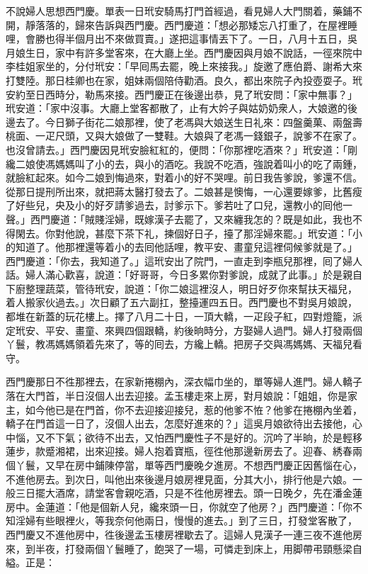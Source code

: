 不說婦人思想西門慶。單表一日玳安騎馬打門首經過，看見婦人大門關着，藥鋪不開，靜落落的，歸來告訴與西門慶。西門慶道：「想必那矮忘八打重了，在屋裡睡哩，會勝也得半個月出不來做買賣。」遂把這事情丟下了。一日，八月十五日，吳月娘生日，家中有許多堂客來，在大廳上坐。西門慶因與月娘不說話，一徑來院中李桂姐家坐的，分付玳安：「早囘馬去罷，晚上來接我。」旋邀了應伯爵、謝希大來打雙陸。那日桂卿也在家，姐妹兩個陪侍勸酒。良久，都出來院子內投壺耍子。玳安約至日西時分，勒馬來接。西門慶正在後邊出恭，見了玳安問：「家中無事？」玳安道：「家中沒事。大廳上堂客都散了，止有大妗子與姑奶奶衆人，大娘邀的後邊去了。今日獅子街花二娘那裡，使了老馮與大娘送生日礼來：{}四盤羹菓、兩盤壽桃面、一疋尺頭，又與大娘做了一雙鞋。大娘與了老馮一錢銀子，說爹不在家了。也沒曾請去。」{}西門慶因見玳安臉紅紅的，便問：「你那裡吃酒來？」玳安道：「剛纔二娘使馮媽媽叫了小的去，與小的酒吃。我說不吃酒，強說着叫小的吃了兩鍾，就臉紅起來。{}如今二娘到悔過來，對着小的好不哭哩。前日我告爹說，爹還不信。從那日提刑所出來，就把蔣太醫打發去了。二娘甚是懊悔，一心還要嫁爹，比舊瘦了好些兒，央及小的好歹請爹過去，討爹示下。爹若吐了口兒，還教小的囘他一聲。」西門慶道：「賊賤淫婦，既嫁漢子去罷了，又來纏我怎的？既是如此，我也不得閑去。你對他說，甚麼下茶下礼，揀個好日子，擡了那淫婦來罷。」{}玳安道：「小的知道了。他那裡還等着小的去囘他話哩，教平安、畫童兒這裡伺候爹就是了。」西門慶道：「你去，我知道了。」這玳安出了院門，一直走到李瓶兒那裡，囘了婦人話。婦人滿心歡喜，說道：「好哥哥，今日多累你對爹說，成就了此事。」於是親自下廚整理蔬菜，管待玳安，說道：「你二娘這裡沒人，明日好歹你來幫扶天福兒，着人搬家伙過去。」次日顧了五六副扛，整擡運四五日。西門慶也不對吳月娘說，都堆在新蓋的玩花樓上。擇了八月二十日，一頂大轎，一疋段子紅，四對燈籠，派定玳安、平安、畫童、來興四個跟轎，約後晌時分，方娶婦人過門。婦人打發兩個丫鬟，教馮媽媽領着先來了，等的囘去，方纔上轎。把房子交與馮媽媽、天福兒看守。

西門慶那日不徃那裡去，在家新捲棚內，深衣幅巾坐的，單等婦人進門。婦人轎子落在大門首，半日沒個人出去迎接。{}孟玉樓走來上房，對月娘說：「姐姐，你是家主，如今他已是在門首，你不去迎接迎接兒，惹的他爹不恠？他爹在捲棚內坐着，轎子在門首這一日了，沒個人出去，怎麼好進來的？」這吳月娘欲待出去接他，心中惱，又不下氣；欲待不出去，又怕西門慶性子不是好的。沉吟了半晌，於是輕移蓮步，款蹙湘裙，出來迎接。婦人抱着寶瓶，徑徃他那邊新房去了。迎春、綉春兩個丫鬟，又早在房中鋪陳停當，單等西門慶晚夕進房。不想西門慶正因舊惱在心，不進他房去。到次日，叫他出來後邊月娘房裡見面，分其大小，排行他是六娘。一般三日擺大酒席，請堂客會親吃酒，只是不徃他房裡去。頭一日晚夕，先在潘金蓮房中。金蓮道：「他是個新人兒，{}纔來頭一日，你就空了他房？」西門慶道：「你不知淫婦有些眼裡火，等我奈何他兩日，慢慢的進去。」到了三日，打發堂客散了，西門慶又不進他房中，徃後邊孟玉樓房裡歇去了。這婦人見漢子一連三夜不進他房來，到半夜，打發兩個丫鬟睡了，飽哭了一場，可憐走到床上，用脚帶弔頸懸梁自縊。{}正是：

